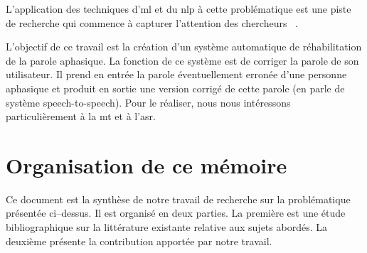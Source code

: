 L'application des techniques d'\gls{ml} et du \gls{nlp} à cette problématique est une piste de recherche 
qui commence à capturer l'attention des chercheurs%
~\cite{Smaili_Langlois_Pribil_2022,Qin_Lee_Kong_Lin_2022,Misra_Mishra_Gandhi_2022,%
Li_Knopman_Xu_Cohen_Pakhomov_2022,Misra_Mishra_Gandhi_2022}.

L'objectif de ce travail est la création d'un système automatique de réhabilitation de la parole aphasique.
La fonction de ce système est de corriger la parole de son utilisateur.
Il prend en entrée la parole éventuellement erronée d'une personne aphasique
et produit en sortie une version corrigé de cette parole 
(en parle de système \foreignlanguage{english}{speech-to-speech}).
Pour le réaliser, nous nous intéressons particulièrement à la \gls{mt} et à l'\gls{asr}.

\section*{Organisation de ce mémoire}

Ce document est la synthèse de notre travail de recherche sur la problématique présentée ci--dessus.
Il est organisé en deux parties.
La première est une étude bibliographique sur la littérature existante relative aux sujets abordés.
La deuxième présente la contribution apportée par notre travail.

\subsection*{}

